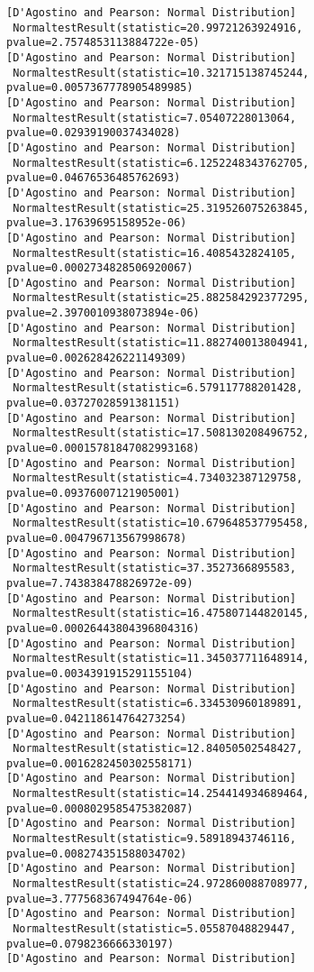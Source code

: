 \documentclass[11pt]{article}
\begin{document}
\begin{Verbatim}[commandchars=\\\{\}]
[D'Agostino and Pearson: Normal Distribution]
 NormaltestResult(statistic=20.99721263924916, pvalue=2.7574853113884722e-05)
[D'Agostino and Pearson: Normal Distribution]
 NormaltestResult(statistic=10.321715138745244, pvalue=0.0057367778905489985)
[D'Agostino and Pearson: Normal Distribution]
 NormaltestResult(statistic=7.05407228013064, pvalue=0.02939190037434028)
[D'Agostino and Pearson: Normal Distribution]
 NormaltestResult(statistic=6.1252248343762705, pvalue=0.04676536485762693)
[D'Agostino and Pearson: Normal Distribution]
 NormaltestResult(statistic=25.319526075263845, pvalue=3.17639695158952e-06)
[D'Agostino and Pearson: Normal Distribution]
 NormaltestResult(statistic=16.4085432824105, pvalue=0.0002734828506920067)
[D'Agostino and Pearson: Normal Distribution]
 NormaltestResult(statistic=25.882584292377295, pvalue=2.3970010938073894e-06)
[D'Agostino and Pearson: Normal Distribution]
 NormaltestResult(statistic=11.882740013804941, pvalue=0.002628426221149309)
[D'Agostino and Pearson: Normal Distribution]
 NormaltestResult(statistic=6.579117788201428, pvalue=0.03727028591381151)
[D'Agostino and Pearson: Normal Distribution]
 NormaltestResult(statistic=17.508130208496752, pvalue=0.00015781847082993168)
[D'Agostino and Pearson: Normal Distribution]
 NormaltestResult(statistic=4.734032387129758, pvalue=0.09376007121905001)
[D'Agostino and Pearson: Normal Distribution]
 NormaltestResult(statistic=10.679648537795458, pvalue=0.004796713567998678)
[D'Agostino and Pearson: Normal Distribution]
 NormaltestResult(statistic=37.3527366895583, pvalue=7.743838478826972e-09)
[D'Agostino and Pearson: Normal Distribution]
 NormaltestResult(statistic=16.475807144820145, pvalue=0.00026443804396804316)
[D'Agostino and Pearson: Normal Distribution]
 NormaltestResult(statistic=11.345037711648914, pvalue=0.0034391915291155104)
[D'Agostino and Pearson: Normal Distribution]
 NormaltestResult(statistic=6.334530960189891, pvalue=0.042118614764273254)
[D'Agostino and Pearson: Normal Distribution]
 NormaltestResult(statistic=12.84050502548427, pvalue=0.0016282450302558171)
[D'Agostino and Pearson: Normal Distribution]
 NormaltestResult(statistic=14.254414934689464, pvalue=0.0008029585475382087)
[D'Agostino and Pearson: Normal Distribution]
 NormaltestResult(statistic=9.58918943746116, pvalue=0.008274351588034702)
[D'Agostino and Pearson: Normal Distribution]
 NormaltestResult(statistic=24.972860088708977, pvalue=3.777568367494764e-06)
[D'Agostino and Pearson: Normal Distribution]
 NormaltestResult(statistic=5.05587048829447, pvalue=0.0798236666330197)
[D'Agostino and Pearson: Normal Distribution]

\end{Verbatim}
\end{document}
